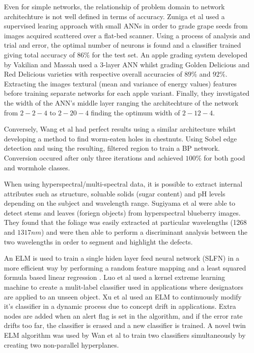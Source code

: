 \documentclass[fleqn,twoside,12pt]{report}
\begin{document}
Even for simple networks, the relationship of problem domain to network architechture is not well defined in terms of accuracy. Zuniga et al \cite{zuniga} used a supervised learing approach with small ANNs in order to grade grape seeds from images acquired scattered over a flat-bed scanner. Using a process of analysis and trial and error, the optimal number of neurons is found and a classifier trained giving total accuracy of $86\%$ for the test set. An apple grading system developed by Vakilian and Massah \cite{vakilian} used a 3-layer ANN whilst grading Golden Delicious and Red Delicious varieties with respective overall accuracies of $89\%$ and $92\%$. Extracting the images textural (mean and variance of energy values) features before training separate networks for each apple variant. Finally, they invstigated the width of the ANN's middle layer ranging the architechture of the network from $2-2-4$ to $2-20-4$ finding the optimum width of $2-12-4$. 

Conversely, Wang et al \cite{wang} had perfect results using a similar architecture whilst developing a method to find worm-eaten holes in chestnuts. Using Sobel edge detection and using the resulting, filtered region to train a BP network. Conversion occured after only three iterations and achieved $100\%$ for both good and wormhole classes.

When using hyperspectral/multi-spectral data, it is possible to extract internal attributes such as structure, soluable solids (sugar content) and pH levels depending on the subject and wavelength range. Sugiyama et al \cite{sugiyama} were able to detect stems and leaves (foriegn objects) from hyperspectral blueberry images. They found that the foliage was easily extracted at particular wavelengths (1268 and $1317nm$) and were then able to perform a discriminant analysis between the two wavelengths in order to segment and highlight the defects.

An ELM is used to train a single hiden layer feed neural network (SLFN) in a more efficient way by performing a random feature mapping and a least squared formula based linear regression \cite{peng}. Luo et al \cite{luo} used a kernel extreme learning machine to create a mulit-label classifier used in applications where designators are applied to an unseen object. Xu et al \cite{xu} used an ELM to continuously modify it's classifier in a dynamic process due to concept drift in applications. Extra nodes are added when an alert flag is set in the algorithm, and if the error rate drifts too far, the classifier is erased and a new classifier is trained. A novel twin ELM algorithm was used by Wan et al \cite{wan} to train two classifiers simultaneously by creating two non-parallel hyperplanes. 
\end{document}
